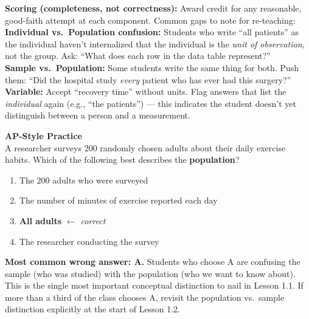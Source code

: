 \documentclass[10pt]{article}
\begin{document}
\begin{teachernote}
\scriptsize
\textbf{Scoring (completeness, not correctness):} Award credit for any reasonable, good-faith
attempt at each component. Common gaps to note for re-teaching:\\[3pt]
\textbf{Individual vs.\ Population confusion:} Students who write ``all patients'' as the
individual haven't internalized that the individual is the \emph{unit of observation},
not the group. Ask: ``What does each row in the data table represent?''\\[3pt]
\textbf{Sample vs.\ Population:} Some students write the same thing for both. Push them:
``Did the hospital study \emph{every} patient who has ever had this surgery?''\\[3pt]
\textbf{Variable:} Accept ``recovery time'' without units. Flag answers that list the
\emph{individual} again (e.g., ``the patients'') — this indicates the student doesn't yet
distinguish between a person and a measurement.
\end{teachernote}

\vspace{0.18in}

\begin{tcolorbox}[colback=redbg, colframe=redacc, boxrule=0.8pt, arc=2mm,
    left=4mm, right=4mm, top=3mm, bottom=3mm]
\small\textbf{AP-Style Practice}\\[6pt]
A researcher surveys 200 randomly chosen adults about their daily exercise habits.
Which of the following best describes the \textbf{population}?

\vspace{10pt}
\begin{enumerate}[label=\textbf{(\Alph*)}, leftmargin=2em, itemsep=6pt]
  \item The 200 adults who were surveyed
  \item The number of minutes of exercise reported each day
  \item \textbf{\textcolor{keyred}{All adults}} \textcolor{keyred}{\textit{$\leftarrow$ correct}}
  \item The researcher conducting the survey
\end{enumerate}
\end{tcolorbox}

\vspace{0.1in}
\noindent{} \quad
{}

\vspace{0.12in}
\begin{teachernote}
\textbf{Most common wrong answer: A.} Students who choose A are confusing the
sample (who was studied) with the population (who we want to know about).
This is the single most important conceptual distinction to nail in Lesson 1.1.
If more than a third of the class chooses A, revisit the population vs.\ sample
distinction explicitly at the start of Lesson 1.2.
\end{teachernote}
\end{document}
